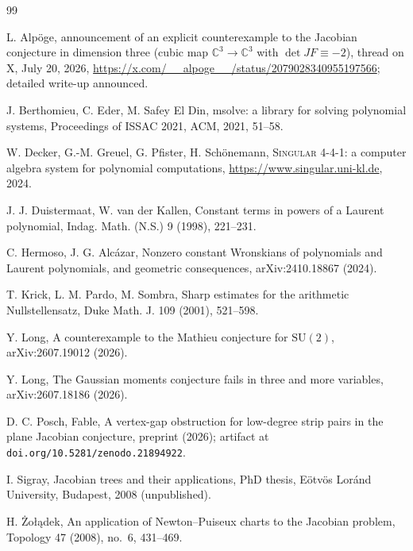 \documentclass[11pt]{article}
\theoremstyle{definition}
\theoremstyle{remark}
\begin{document}
\small
\begin{thebibliography}{99}

 L. Alp\"oge, announcement of an explicit counterexample to the Jacobian conjecture in dimension three (cubic map $\mathbb{C}^3\to\mathbb{C}^3$ with $\det JF\equiv-2$), thread on X, July 20, 2026, \url{https://x.com/__alpoge__/status/2079028340955197566}; detailed write-up announced.

 J. Berthomieu, C. Eder, M. Safey El Din, msolve: a library for solving polynomial systems, Proceedings of ISSAC 2021, ACM, 2021, 51--58.

 W. Decker, G.-M. Greuel, G. Pfister, H. Sch\"onemann, \textsc{Singular} 4-4-1: a computer algebra system for polynomial computations, \url{https://www.singular.uni-kl.de}, 2024.

 J. J. Duistermaat, W. van der Kallen, Constant terms in powers of a Laurent polynomial, Indag. Math. (N.S.) 9 (1998), 221--231.

 C. Hermoso, J. G. Alc\'azar, Nonzero constant Wronskians of polynomials and Laurent polynomials, and geometric consequences, arXiv:2410.18867 (2024).

 T. Krick, L. M. Pardo, M. Sombra, Sharp estimates for the arithmetic Nullstellensatz, Duke Math. J. 109 (2001), 521--598.

 Y. Long, A counterexample to the Mathieu conjecture for $\mathrm{SU}(2)$, arXiv:2607.19012 (2026).

 Y. Long, The Gaussian moments conjecture fails in three and more variables, arXiv:2607.18186 (2026).

 D. C. Posch, Fable, A vertex-gap obstruction for low-degree strip pairs in the plane Jacobian conjecture, preprint (2026); artifact at \texttt{doi.org/10.5281/zenodo.21894922}.

 I. Sigray, Jacobian trees and their applications, PhD thesis, E\"otv\"os Lor\'and University, Budapest, 2008 (unpublished).

 H. \.Zo{\l}\k{a}dek, An application of Newton--Puiseux charts to the Jacobian problem, Topology 47 (2008), no.\ 6, 431--469.

\end{thebibliography}
\end{document}
